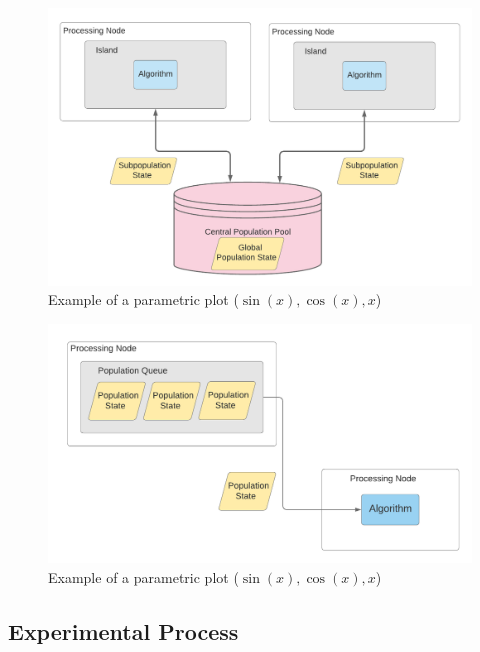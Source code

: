 \documentclass[review]{elsarticle}
\begin{document}
\begin{figure}[h]
    \centering
    \includegraphics[width=\textwidth]{population_pool}
    \caption{Example of a parametric plot ($\sin (x), \cos(x), x$)}
    \label{fig:kafkEO}
\end{figure}


\begin{figure}[h]
    \centering
    \includegraphics[width=\textwidth]{population_message}
    \caption{Example of a parametric plot ($\sin (x), \cos(x), x$)} %
    \label{fig:kafkEO}
\end{figure}

\subsection{Experimental Process} 
\label{edm}
\end{document}
